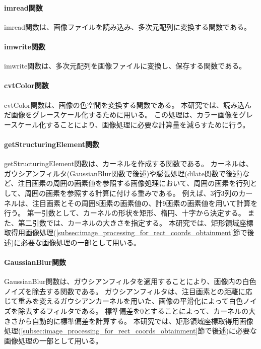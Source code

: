\paragraph{imread関数}
imread関数は、画像ファイルを読み込み、多次元配列に変換する関数である。

\paragraph{imwrite関数}
imwrite関数は、多次元配列を画像ファイルに変換し、保存する関数である。

\paragraph{cvtColor関数}
cvtColor関数は、画像の色空間を変換する関数である。
本研究では、読み込んだ画像をグレースケール化するために用いる。
この処理は、カラー画像をグレースケール化することにより、画像処理に必要な計算量を減らすために行う。

\paragraph{getStructuringElement関数}
getStructuringElement関数は、カーネルを作成する関数である\cite{getStructuringElement関数}。
カーネルは、ガウシアンフィルタ(GaussianBlur関数で後述)や膨張処理(dilate関数で後述)など、注目画素の周囲の画素値を参照する画像処理において、周囲の画素を行列として、周囲の画素を参照する計算に付ける重みである。
例えば、3行3列のカーネルは、注目画素とその周囲8画素の画素値の、計9画素の画素値を用いて計算を行う。
第一引数として、カーネルの形状を矩形、楕円、十字から決定する。
また、第二引数では、カーネルの大きさを指定する。
本研究では、矩形領域座標取得用画像処理(\ref{subsec:image_processing_for_rect_coords_obtainment}節で後述)に必要な画像処理の一部として用いる。

\paragraph{GaussianBlur関数}
GaussianBlur関数は、ガウシアンフィルタを適用することにより、画像内の白色ノイズを除去する関数である。
ガウシアンフィルタは、注目画素との距離に応じて重みを変えるガウシアンカーネルを用いた、画像の平滑化によって白色ノイズを除去するフィルタである。
標準偏差を$0$とすることによって、カーネルの大きさから自動的に標準偏差を計算する\cite{ガウシアンフィルタ}。
本研究では、矩形領域座標取得用画像処理(\ref{subsec:image_processing_for_rect_coords_obtainment}節で後述)に必要な画像処理の一部として用いる。

